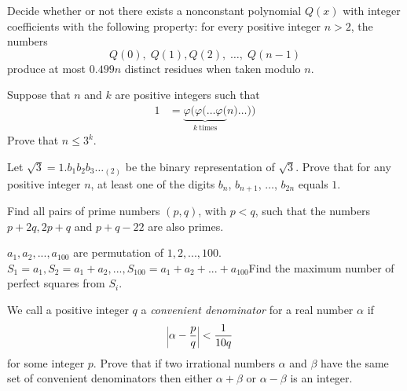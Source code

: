 \documentclass[problems.tex]{subfile}
\begin{document}
	\begin{problem}
		Decide whether or not there exists a nonconstant polynomial $Q(x)$ with integer coefficients with the following property: for every positive integer $n > 2$, the numbers \[ Q(0), \; Q(1), Q(2), \; \dots, \; Q(n-1) \]produce at most $0.499n$ distinct residues when taken modulo $n$. %
	\end{problem}

	\begin{problem}
		Suppose that $n$ and $k$ are positive integers such that
			\begin{align*}
				1
					& = \underbrace{\varphi( \varphi( \dots \varphi(}_{k\ \text{times}} n) \dots ))
			\end{align*}
		Prove that $n \le 3^k$. %
	\end{problem}

	\begin{problem}
		Let $\sqrt 3 = 1.b_1b_2b_3 \dots _{(2)}$ be the binary representation of $\sqrt 3$. Prove that for any positive integer $n$, at least one of the digits $b_n$, $b_{n+1}$, $\dots$, $b_{2n}$ equals $1$. %
	\end{problem}

	\begin{problem}
		Find all pairs of prime numbers $(p, q)$, with $p <q$, such that the numbers $p + 2q, 2p + q$ and $p + q - 22$ are also primes.
	\end{problem}

	\begin{problem}
		$a_1,a_2,...,a_{100}$ are permutation of $1,2,...,100$. $S_1=a_1, S_2=a_1+a_2,...,S_{100}=a_1+a_2+...+a_{100}$Find the maximum number of perfect squares from $S_i$. %
	\end{problem}

	\begin{problem}
		We call a positive integer $q$ a \textit{convenient denominator} for a real number $\alpha$ if
			\begin{align*}
				\scaleleftright[.5ex]{|}{\alpha - \dfrac{p}{q}}{|}
					& <\dfrac{1}{10q}
			\end{align*}
		for some integer $p$. Prove that if two irrational numbers $\alpha$ and
		$\beta$ have the same set of convenient denominators then either $\alpha+\beta$ or $\alpha- \beta$ is an integer\watermark. %
	\end{problem}
\end{document}

